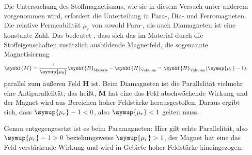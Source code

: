 Die Untersuchung des Stoffmagnetismus, wie sie in diesem Versuch unter anderem vorgenommen wird, erfordert die Unterteilung 
in Para-, Dia- und Ferromagneten. 
Die relative Permeabilität $\mu_r$ von sowohl Para-, als auch Diamagneten ist eine konstante Zahl. 
Das bedeutet 
, dass sich das im Material durch die Stoffeigenschaften zusätzlich ausbildende Magnetfeld, die 
sogenannte Magnetisierung 
\begin{equation}
\symbf{M}=\frac{1}{\symup{\mu_0}}\symbf{B}_\text{Materie}-\symbf{H}_\text{Vakuum}=\symbf{H}_\text{Vakuum}(\symup{\mu_r}-1) \text{,} 
\label{eqn:Magnetisierung}
\end{equation}
parallel zum äußeren Feld $\symbf{H}$ ist. 
Beim Diamagneten ist die Parallelität vielmehr eine Antiparallelität; das heißt, $\symbf{M}$ hat eine das Feld
abschwächende Wirkung und der Magnet wird aus Bereichen hoher Feldstärke herausgestoßen. 
Daraus ergibt sich, dass $\symup{\mu_r}-1 < 0$, also $\symup{\mu_r}<1$ gelten muss. 

Genau entgegengesetzt ist es beim Paramagneten: Hier gilt echte Parallelität, also $\symup{\mu_r}-1 > 0$ beziehungsweise 
$\symup{\mu_r}> 1$, der Magnet hat eine das Feld verstärkende Wirkung und wird in Gebiete hoher Feldstärke hineingezogen.

